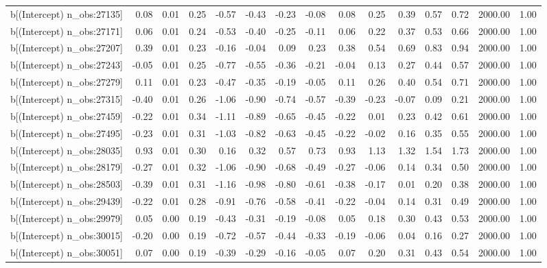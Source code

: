 \begin{table}[ht]
\begin{tabular}{rrrrrrrrrrrrrrr}
  b[(Intercept) n\_obs:27135] & 0.08 & 0.01 & 0.25 & -0.57 & -0.43 & -0.23 & -0.08 & 0.08 & 0.25 & 0.39 & 0.57 & 0.72 & 2000.00 & 1.00 \\ 
  b[(Intercept) n\_obs:27171] & 0.06 & 0.01 & 0.24 & -0.53 & -0.40 & -0.25 & -0.11 & 0.06 & 0.22 & 0.37 & 0.53 & 0.66 & 2000.00 & 1.00 \\ 
  b[(Intercept) n\_obs:27207] & 0.39 & 0.01 & 0.23 & -0.16 & -0.04 & 0.09 & 0.23 & 0.38 & 0.54 & 0.69 & 0.83 & 0.94 & 2000.00 & 1.00 \\ 
  b[(Intercept) n\_obs:27243] & -0.05 & 0.01 & 0.25 & -0.77 & -0.55 & -0.36 & -0.21 & -0.04 & 0.13 & 0.27 & 0.44 & 0.57 & 2000.00 & 1.00 \\ 
  b[(Intercept) n\_obs:27279] & 0.11 & 0.01 & 0.23 & -0.47 & -0.35 & -0.19 & -0.05 & 0.11 & 0.26 & 0.40 & 0.54 & 0.71 & 2000.00 & 1.00 \\ 
  b[(Intercept) n\_obs:27315] & -0.40 & 0.01 & 0.26 & -1.06 & -0.90 & -0.74 & -0.57 & -0.39 & -0.23 & -0.07 & 0.09 & 0.21 & 2000.00 & 1.00 \\ 
  b[(Intercept) n\_obs:27459] & -0.22 & 0.01 & 0.34 & -1.11 & -0.89 & -0.65 & -0.45 & -0.22 & 0.01 & 0.23 & 0.42 & 0.61 & 2000.00 & 1.00 \\ 
  b[(Intercept) n\_obs:27495] & -0.23 & 0.01 & 0.31 & -1.03 & -0.82 & -0.63 & -0.45 & -0.22 & -0.02 & 0.16 & 0.35 & 0.55 & 2000.00 & 1.00 \\ 
  b[(Intercept) n\_obs:28035] & 0.93 & 0.01 & 0.30 & 0.16 & 0.32 & 0.57 & 0.73 & 0.93 & 1.13 & 1.32 & 1.54 & 1.73 & 2000.00 & 1.00 \\ 
  b[(Intercept) n\_obs:28179] & -0.27 & 0.01 & 0.32 & -1.06 & -0.90 & -0.68 & -0.49 & -0.27 & -0.06 & 0.14 & 0.34 & 0.50 & 2000.00 & 1.00 \\ 
  b[(Intercept) n\_obs:28503] & -0.39 & 0.01 & 0.31 & -1.16 & -0.98 & -0.80 & -0.61 & -0.38 & -0.17 & 0.01 & 0.20 & 0.38 & 2000.00 & 1.00 \\ 
  b[(Intercept) n\_obs:29439] & -0.22 & 0.01 & 0.28 & -0.91 & -0.76 & -0.58 & -0.41 & -0.22 & -0.04 & 0.14 & 0.31 & 0.49 & 2000.00 & 1.00 \\ 
  b[(Intercept) n\_obs:29979] & 0.05 & 0.00 & 0.19 & -0.43 & -0.31 & -0.19 & -0.08 & 0.05 & 0.18 & 0.30 & 0.43 & 0.53 & 2000.00 & 1.00 \\ 
  b[(Intercept) n\_obs:30015] & -0.20 & 0.00 & 0.19 & -0.72 & -0.57 & -0.44 & -0.33 & -0.19 & -0.06 & 0.04 & 0.16 & 0.27 & 2000.00 & 1.00 \\ 
  b[(Intercept) n\_obs:30051] & 0.07 & 0.00 & 0.19 & -0.39 & -0.29 & -0.16 & -0.05 & 0.07 & 0.20 & 0.31 & 0.43 & 0.54 & 2000.00 & 1.00 \\ 

\end{tabular}
\end{table}
